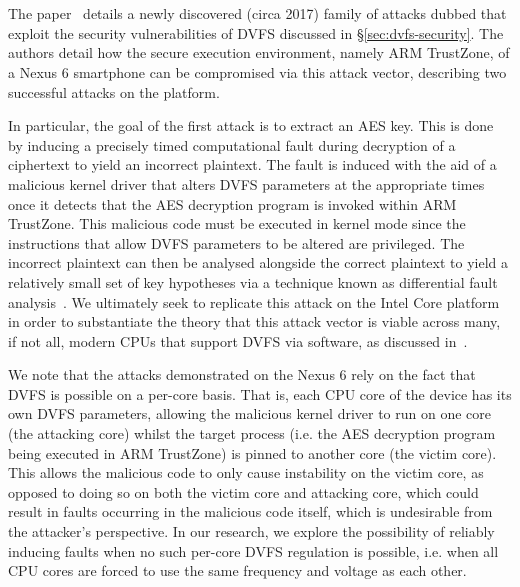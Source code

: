 \section{\clkscrew{}}
\label{sec:clkscrew-review}

The \clkscrew{} paper~\cite{clkscrew} details a newly discovered (circa 2017)
family of attacks dubbed \clkscrew{} that exploit the security vulnerabilities
of DVFS discussed in §\ref{sec:dvfs-security}. The authors detail how the secure
execution environment, namely ARM TrustZone, of a Nexus 6 smartphone can be
compromised via this attack vector, describing two successful attacks on the
platform.

In particular, the goal of the first attack is to extract an AES key. This is
done by inducing a precisely timed computational fault during decryption of a
ciphertext to yield an incorrect plaintext. The fault is induced with the aid of
a malicious kernel driver that alters DVFS parameters at the appropriate times
once it detects that the AES decryption program is invoked within ARM TrustZone.
This malicious code must be executed in kernel mode since the instructions that
allow DVFS parameters to be altered are privileged. The incorrect plaintext can then be
analysed alongside the correct plaintext to yield a relatively small set of key
hypotheses via a technique known as differential fault analysis~\cite{tunstallDFA}.
We ultimately seek to replicate this attack on the Intel Core platform in order
to substantiate the theory that this attack vector is viable across many, if not
all, modern CPUs that support DVFS via software, as discussed in~\cite[§6.1]{clkscrew}.

We note that the attacks demonstrated on the Nexus 6 rely on the fact that DVFS
is possible on a per-core basis. That is, each CPU core of the device has its
own DVFS parameters, allowing the malicious kernel driver to run on one core
(the attacking core) whilst the target process (i.e. the AES decryption program
being executed in ARM TrustZone) is pinned to another core (the victim core).
This allows the malicious code to only cause instability on the victim core, as
opposed to doing so on both the victim core and attacking core, which could
result in faults occurring in the malicious code itself, which is undesirable
from the attacker's perspective. In our research, we explore the possibility of
reliably inducing faults when no such per-core DVFS regulation is possible,
i.e. when all CPU cores are forced to use the same frequency and voltage as
each other.
